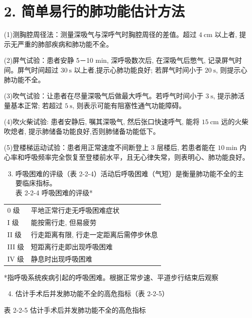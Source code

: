 \documentclass[10pt]{article}
\begin{document}
\section*{2. 简单易行的肺功能估计方法}
(1)测胸腔周径法：测量深吸气与深呼气时胸腔周径的差值。超过 $4 \mathrm{~cm}$ 以上者, 提示无严重的肺部疾病和肺功能不全。

(2)屏气试验：患者安静 5－10 min, 深呼吸数次后, 在深吸气后憋气, 记录屏气时间。屏气时间超过 $30 \mathrm{~s}$ 以上者,提示心肺功能良好; 若屏气时间小于 $20 \mathrm{~s}$, 则提示心肺功能不全。

(3)吹气试验：让患者在尽量深吸气后做最大呼气。若呼气时间小于 $3 \mathrm{~s}$, 提示肺活量基本正常; 若超过 $5 \mathrm{~s}$, 则表示可能有阻塞性通气功能障碍。

(4)吹火柴试验: 患者安静后, 嘱其深吸气, 然后张口快速呼气, 能将 $15 \mathrm{~cm}$ 远的火柴吹熄者, 提示肺储备功能良好,否则肺储备功能低下。

(5)登楼梯运动试验：患者用正常速度不间断登上 3 层楼后, 若患者能在 $10 \mathrm{~min}$ 内心率和呼吸频率完全恢复至登楼前水平，且无心律失常，则表明心、肺功能良好。

\begin{enumerate}
  \setcounter{enumi}{2}
  \item 呼吸困难的评级（表 2-2-4）活动后呼吸困难（气短）是衡量肺功能不全的主要临床指标。\\
表 2-2-4 呼吸困难的评级*
\end{enumerate}

\begin{center}
\begin{tabular}{ll}
0 级 & 平地正常行走无呼吸困难症状 \\
I 级 & 能按需行走, 但易疲劳 \\
II 级 & 行走距离有限, 行走一定距离后需停步休息 \\
III 级 & 短距离行走即出现呼吸困难 \\
IV 级 & 静息时出现呼吸困难 \\
\end{tabular}
\end{center}

*指呼吸系统疾病引起的呼吸困难。根据正常步速、平道步行结束后观察

\begin{enumerate}
  \setcounter{enumi}{3}
  \item 估计手术后并发肺功能不全的高危指标（表 2-2-5）
\end{enumerate}

表 2-2-5 估计手术后并发肺功能不全的高危指标
\end{document}
